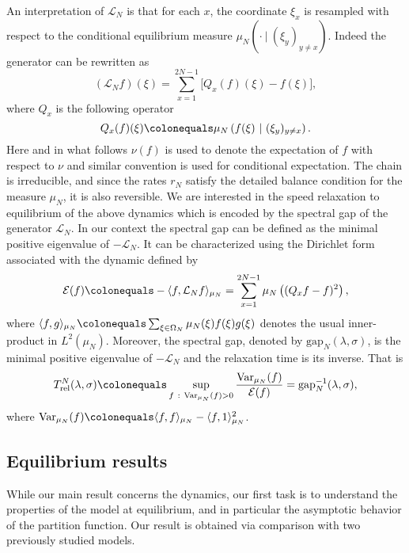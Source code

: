 \documentclass[reqno,11pt]{amsart}
\numberwithin{equation}{section}
\newcommand{\cL}{{\ensuremath{\mathcal L}} }
\newcommand{\Var}{\mathrm{Var}}
\newcommand{\Gap}{\mathrm{gap}}
\newcommand{\Rel}{\mathrm{rel}}
\begin{document}
An interpretation of $\cL_N$ is that for each $x$, the coordinate $\xi_x$ is   resampled
 with respect to the conditional equilibrium measure  $\mu_N \left( \cdot  \ | \   (\xi_y)_ {y \neq x}\right)$.   Indeed
the generator can be rewritten as 
\begin{equation*}
(\mathcal{L}_Nf)(\xi)= \sum_{x=1}^{2N-1} \Big[Q_x(f)(\xi)-f(\xi)\Big], 
\end{equation*}
 where $Q_x$ is the following operator 
\begin{equation*}
Q_x(f)(\xi)\colonequals\mu_N \left(f(\xi) \ | \   (\xi_y)_ {y \neq x}\right).
 \end{equation*}
 Here and in what follows $\nu(f)$ is used to denote the expectation of $f$ with respect to $\nu$ and similar convention is used for conditional expectation.
The chain is irreducible, 
and since the rates $r_N$ satisfy the detailed balance condition for the measure $\mu_N$, it is also reversible.
We are interested in the speed relaxation to equilibrium of the above dynamics which is encoded by the spectral gap of the generator $\cL_N$.
In our context the spectral gap  can be defined as the minimal positive eigenvalue of $-\cL_N$.
It can be characterized using the Dirichlet form associated with the dynamic defined by
\begin{equation*}
\mathcal{E}(f) \colonequals -\langle f, \mathcal{L}_Nf\rangle_{\mu_N}=\sum_{x=1}^{2N-1}\mu_N \left((Q_xf-f)^2\right),
\end{equation*}
where $\langle f, g \rangle_{{\mu_N}} \colonequals \sum_{\xi \in \Omega_N} \mu_N(\xi)f(\xi)g(\xi)$ denotes the usual inner-product in $L^2(\mu_N)$. Moreover, the spectral gap, denoted by $\Gap_N(\lambda,\sigma)$, is the minimal positive eigenvalue of $-\mathcal{L}_N$ and the relaxation time 
is its inverse. That is
\begin{equation}
T_{\Rel}^N(\lambda, \sigma) \colonequals \sup_{f \ : \ \Var_{\mu_N}(f)>0}\frac{\Var_{\mu_N}(f)}{\mathcal{E}(f)}=\Gap_N^{-1}(\lambda, \sigma),\label{defRelTime}
\end{equation}  
where $\Var_{\mu_N}(f)\colonequals \langle f, f\rangle_{\mu_N}-\langle f, 1 \rangle^2_{\mu_N}$. 


\subsection{Equilibrium results}\label{sec:equili}

While our main result concerns the dynamics, our first task is to understand the properties  of the model at equilibrium, and in particular the asymptotic behavior of the partition function. Our result is obtained via comparison with two previously studied models.
\end{document}
